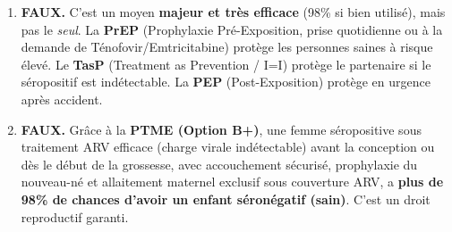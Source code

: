 \documentclass[11pt]{article}
\begin{document}
\begin{exoresolu}
\begin{enumerate}
    \item \textbf{FAUX.} C'est un moyen \textbf{majeur et très efficace} (98\% si bien utilisé), mais pas le \emph{seul}. La \textbf{PrEP} (Prophylaxie Pré-Exposition, prise quotidienne ou à la demande de Ténofovir/Emtricitabine) protège les personnes saines à risque élevé. Le \textbf{TasP} (Treatment as Prevention / I=I) protège le partenaire si le séropositif est indétectable. La \textbf{PEP} (Post-Exposition) protège en urgence après accident.
    \item \textbf{FAUX.} Grâce à la \textbf{PTME (Option B+)}, une femme séropositive sous traitement ARV efficace (charge virale indétectable) avant la conception ou dès le début de la grossesse, avec accouchement sécurisé, prophylaxie du nouveau-né et allaitement maternel exclusif sous couverture ARV, a \textbf{plus de 98\% de chances d'avoir un enfant séronégatif (sain)}. C'est un droit reproductif garanti.
\end{enumerate}
\end{exoresolu}
\end{document}
